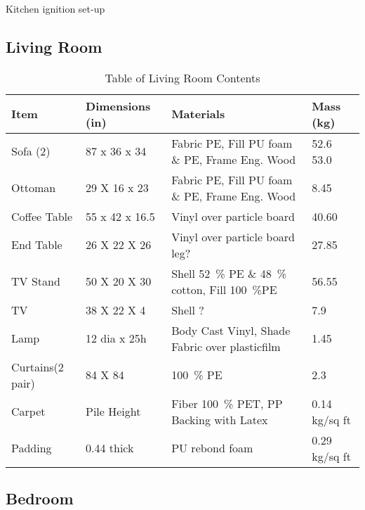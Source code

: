 \documentclass[12pt,oneside]{book}
\begin{document}
Kitchen ignition set-up   




\subsection{Living Room}

\begin{table}[!ht]
	\centering
	\caption{Table of Living Room Contents}
	\label{tab:BRFuel}
	\begin{tabular}{llll}
		\toprule[1.5pt]
		Item 				& Dimensions (in) 	& Materials 										& Mass (kg)  \\
		\midrule
		Sofa (2) 		  	& 87 x 36 x 34  	& Fabric PE, Fill PU foam \& PE, Frame Eng. Wood	& 52.6 53.0      \\
		Ottoman     		& 29 X 16 x 23 		& Fabric PE, Fill PU foam \& PE, Frame Eng. Wood   	& 8.45       \\
		Coffee Table   		& 55 x 42 x 16.5	& Vinyl over particle board  						& 40.60     \\
		End Table      		& 26 X 22 X 26 		& Vinyl over particle board  leg? 					& 27.85     \\	
		TV Stand	 		& 50 X 20 X 30 		& Shell 52~\% PE \& 48~\% cotton, Fill 100~\%PE 	& 56.55   \\	
		TV 					& 38 X 22 X 4		& Shell ?										 	& 7.9       \\
		Lamp 				& 12 dia x 25h		& Body Cast Vinyl, Shade Fabric over plasticfilm	& 1.45  \\
		Curtains(2 pair) 	& 84 X 84 			& 100~\% PE 										& 2.3   \\
		Carpet				&  Pile Height		& Fiber 100~\% PET, PP Backing with Latex			& 0.14 kg/sq ft \\
		Padding				&  0.44	thick   	& PU rebond foam									& 0.29 kg/sq ft	\\
		\bottomrule[1.25pt]
	\end{tabular}
\end{table}



\subsection{Bedroom}
\end{document}
